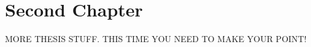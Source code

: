 \chapter{Second Chapter}

MORE THESIS STUFF.
THIS TIME YOU NEED \cite[stuff and things]{source2,source3} TO MAKE YOUR POINT!

